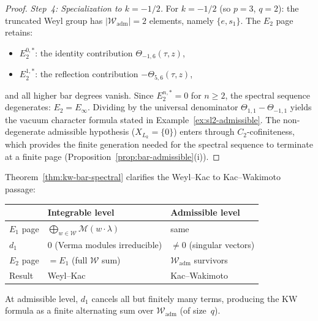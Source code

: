 \begin{proof}
\emph{Step~4: Specialization to $k = -1/2$.}
For $k = -1/2$ (so $p = 3$, $q = 2$): the truncated Weyl group
has $|\mathcal{W}_{\mathrm{adm}}| = 2$ elements, namely $\{e, s_1\}$.
The $E_2$ page retains:
\begin{itemize}
\item $E_2^{0,*}$: the identity contribution $\Theta_{-1,6}(\tau,z)$,
\item $E_2^{1,*}$: the reflection contribution
$-\Theta_{5,6}(\tau,z)$,
\end{itemize}
and all higher bar degrees vanish.
Since $E_2^{n,*} = 0$ for $n \geq 2$, the spectral sequence
degenerates: $E_2 = E_\infty$.  Dividing by the
universal denominator $\Theta_{1,1} - \Theta_{-1,1}$ yields
the vacuum character formula stated in
Example~\ref{ex:sl2-admissible}.
The non-degenerate admissible hypothesis ($X_{L_k} = \{0\}$)
enters through $C_2$-cofiniteness, which provides the finite
generation needed for the spectral sequence to terminate at a
finite page (Proposition~\ref{prop:bar-admissible}(i)).
\end{proof}

\begin{remark}
\label{rem:admissible-vs-integrable}
Theorem~\ref{thm:kw-bar-spectral} clarifies the Weyl--Kac to Kac--Wakimoto passage:
\begin{center}
\renewcommand{\arraystretch}{1.3}
\begin{tabular}{lll}
\toprule
& \textbf{Integrable level} & \textbf{Admissible level} \\
\midrule
$E_1$ page & $\bigoplus_{w \in \mathcal{W}} \mathcal{M}(w \cdot \lambda)$
& same \\
$d_1$ & $0$ (Verma modules irreducible) & $\neq 0$ (singular vectors) \\
$E_2$ page & $= E_1$ (full $\mathcal{W}$ sum) &
$\mathcal{W}_{\mathrm{adm}}$ survivors \\
Result & Weyl--Kac & Kac--Wakimoto \\
\bottomrule
\end{tabular}
\end{center}
At admissible level, $d_1$ cancels all but finitely many terms, producing the KW formula as a finite alternating sum over $\mathcal{W}_{\mathrm{adm}}$ (of size~$q$).
\end{remark}

